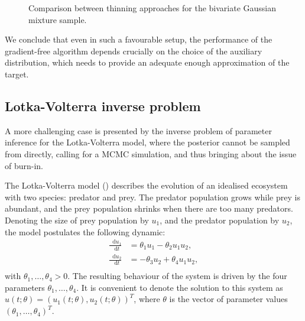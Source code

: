 \documentclass[11pt,a4paper]{report}
\newcommand*\diff{\mathop{}\!\mathrm{d}}
\begin{document}
\begin{figure}[t]
\centering
{}
\caption{Comparison between thinning approaches for the bivariate Gaussian mixture sample.
\label{fig:gmm:comparison}}
\end{figure}

We conclude that even in such a favourable setup, the performance of the gradient-free algorithm depends crucially on the choice of the auxiliary distribution, which needs to provide an adequate enough approximation of the target.

\subsection{Lotka-Volterra inverse problem}
\label{sec:lotka-volterra}

A more challenging case is presented by the inverse problem of parameter inference for the Lotka-Volterra model, where the posterior cannot be sampled from directly, calling for a MCMC simulation, and thus bringing about the issue of burn-in.

The Lotka-Volterra model (\cite{lotkaElementsPhysicalBiology1925,volterraVariazioniFluttuazioniNumero1926}) describes the evolution of an idealised ecosystem with two species: predator and prey. The predator population grows while prey is abundant, and the prey population shrinks when there are too many predators. Denoting the size of prey population by $u_1$, and the predator population by $u_2$, the model postulates the following dynamic:
\begin{equation}
\begin{aligned}
\frac{\diff u_1}{\diff t} & = \theta_1 u_1 - \theta_2 u_1 u_2, \\
\frac{\diff u_2}{\diff t} & = -\theta_3 u_2 + \theta_4 u_1 u_2, \\
\end{aligned}
\label{eq:lotka-volterra}
\end{equation}
with $\theta_1, \dots, \theta_4 > 0$. The resulting behaviour of the system is driven by the four parameters $\theta_1, \dots, \theta_4$. It is convenient to denote the solution to this system as  $u(t;\theta) = (u_1(t; \theta), u_2(t; \theta))^T$, where $\theta$ is the vector of parameter values $(\theta_1, \dots, \theta_4)^T$.
\end{document}
